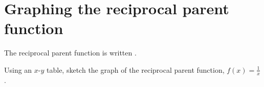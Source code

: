 \section{Graphing the reciprocal parent function}
The reciprocal parent function is written .

\begin{myWideProblem}{3in}
    {
        Using an $x$-$y$ table,
        sketch the graph of the reciprocal parent function, $f(x) = \frac{1}{x}$.
    }
\end{myWideProblem}
%

